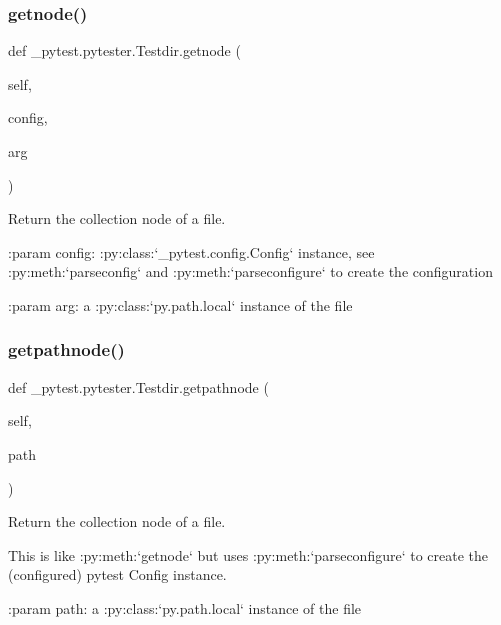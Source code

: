 \subsubsection{\texorpdfstring{getnode()}{getnode()}}
{\footnotesize\ttfamily def \+\_\+pytest.\+pytester.\+Testdir.\+getnode (\begin{DoxyParamCaption}\item[{}]{self,  }\item[{}]{config,  }\item[{}]{arg }\end{DoxyParamCaption})}

\begin{DoxyVerb}Return the collection node of a file.

:param config: :py:class:`_pytest.config.Config` instance, see
   :py:meth:`parseconfig` and :py:meth:`parseconfigure` to create the
   configuration

:param arg: a :py:class:`py.path.local` instance of the file\end{DoxyVerb}
 \mbox{\label{class__pytest_1_1pytester_1_1_testdir_ac544eecddd1077f1de26cd535b1da6a9}} 
\subsubsection{\texorpdfstring{getpathnode()}{getpathnode()}}
{\footnotesize\ttfamily def \+\_\+pytest.\+pytester.\+Testdir.\+getpathnode (\begin{DoxyParamCaption}\item[{}]{self,  }\item[{}]{path }\end{DoxyParamCaption})}

\begin{DoxyVerb}Return the collection node of a file.

This is like :py:meth:`getnode` but uses :py:meth:`parseconfigure` to
create the (configured) pytest Config instance.

:param path: a :py:class:`py.path.local` instance of the file\end{DoxyVerb}
 \mbox{\label{class__pytest_1_1pytester_1_1_testdir_aafd63d830bf03e153edb68743b088bcb}} 
